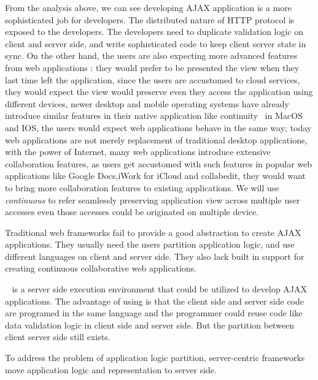From the analysis above,
we can see developing AJAX application is a more sophisticated job for developers.
The distributed nature of HTTP protocol is exposed to the developers.
The developers need to duplicate validation logic on client and server side,
and write sophisticated \js{} code to keep client server state in sync.
On the other hand, 
the users are also expecting more advanced features from web applications :
they would prefer to be presented the view when they last time left the application,
since the users are accustomed to cloud services,
they would expect the view would preserve even they access the application
using different devices,
newer desktop and mobile operating systems have already introduce similar
features in their native application like continuity~\cite{apple} in MacOS and IOS,
the users would expect web applications behave in the same way;
today web applications are not merely replacement of traditional desktop applications,
with the power of Internet,
many web applications introduce extensive collaboration features,
as users get accustomed with such features in popular web applications
like Google Docs,iWork for iCloud and collabedit,
they would want to bring more collaboration features to existing applications.
We will use \emph{continuous} to refer seamlessly preserving application view across
multiple user accesses even those accesses could be originated on multiple device.

Traditional web frameworks fail to provide a good abstraction to create
AJAX applications.
They usually need the users partition application logic,
and use different languages on client and server side.
They also lack built in support for creating
continuous collaborative web applications.

\nodejs{}~\cite{tilkov2010node} is a server side \js{} execution environment
that could be utilized to develop AJAX applications.
The advantage of using \nodejs{} is that the client side and server side code are programed in
the same language and
the programmer could reuse code like data validation logic in client side and server side.
But the partition between client server side still exists.

To address the problem of application logic partition, 
server-centric frameworks move application logic and representation to server side.

